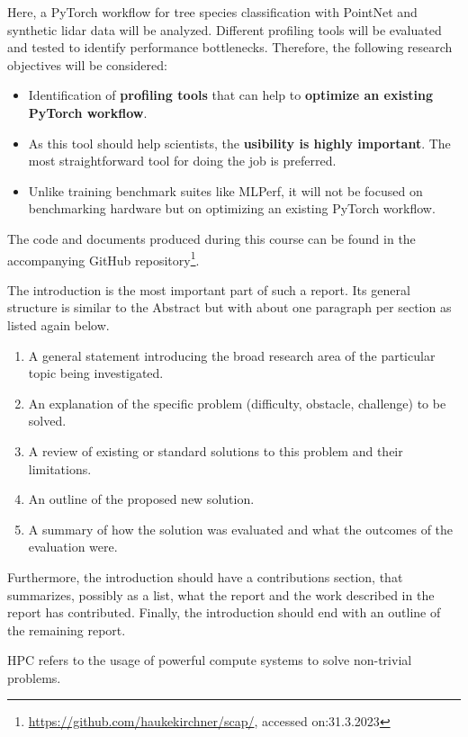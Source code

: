 \documentclass[12pt, a4paper, hidelinks]{article}
\begin{document}
Here, a PyTorch workflow for tree species classification with PointNet and synthetic \ac{lidar} data will be analyzed.
Different profiling tools will be evaluated and tested to identify performance bottlenecks. 
Therefore, the following research objectives will be considered:

\begin{itemize}
    \item Identification of \textbf{profiling tools} that can help to \textbf{optimize an existing PyTorch workflow}.
    \item As this tool should help scientists, the \textbf{usibility is highly important}. The most straightforward tool for doing the job is preferred.
    \item Unlike training benchmark suites like MLPerf, it will not be focused on benchmarking hardware but on optimizing an existing PyTorch workflow.
\end{itemize}

The code and documents produced during this course can be found in the accompanying GitHub repository\footnote{\url{https://github.com/haukekirchner/scap/}, accessed on:31.3.2023}.

\iffalse
The introduction is the most important part of such a report. Its general structure is similar to the Abstract but with about one paragraph per section as listed again below.
\begin{enumerate}
\item  A general statement introducing the broad research area of the particular topic being investigated.
\item  An explanation of the specific problem (difficulty, obstacle, challenge) to be solved.
\item  A review of existing or standard solutions to this problem and their limitations.
\item  An outline of the proposed new solution.
\item  A summary of how the solution was evaluated and what the outcomes of the evaluation were.
\end{enumerate}
Furthermore, the introduction should have a contributions section, that summarizes, possibly as a list, what the report and the work described in the report has contributed.
Finally, the introduction should end with an outline of the remaining report.

\ac{HPC} refers to the usage of powerful compute systems to solve non-trivial problems.
\end{document}
